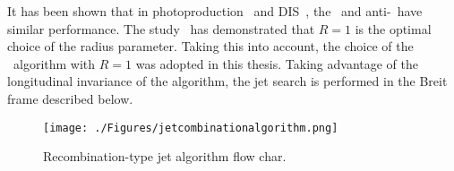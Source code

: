  It has been shown that in photoproduction~\cite{np:b864:1} and DIS~\cite{Abramowicz:2010ke}, the \kt~and anti-\kt~have similar performance. The study~\cite{pl:b649:12} has demonstrated that $R=1$ is the optimal choice of the radius parameter. Taking this into account, the choice of the \kt~algorithm with $R=1$ was adopted in this thesis. Taking advantage of the longitudinal invariance of the algorithm, the jet search is performed in the Breit frame described below.

\begin{figure}
	\centering
		\texttt{[image: ./Figures/jetcombinationalgorithm.png]}
	\caption{Recombination-type jet algorithm flow char.}
	\label{fig:jetcombinationalgorithm}
\end{figure}
